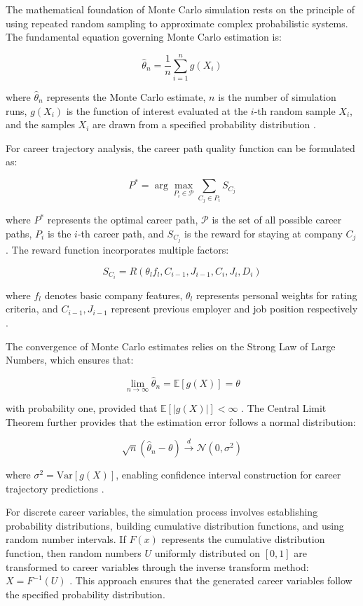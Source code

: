 \documentclass[main.tex]{subfiles}
\begin{document}
The mathematical foundation of Monte Carlo simulation rests on the principle of using repeated random sampling to approximate complex probabilistic systems. The fundamental equation governing Monte Carlo estimation is:

$$\hat{\theta}_n = \frac{1}{n}\sum_{i=1}^{n} g(X_i)$$

where $\hat{\theta}_n$ represents the Monte Carlo estimate, $n$ is the number of simulation runs, $g(X_i)$ is the function of interest evaluated at the $i$-th random sample $X_i$, and the samples $X_i$ are drawn from a specified probability distribution \parencite{usp2024,sciencedirect2024}.

For career trajectory analysis, the career path quality function can be formulated as:

$$P^* = \arg\max_{P_i \in \mathcal{P}} \sum_{C_j \in P_i} S_{C_j}$$

where $P^*$ represents the optimal career path, $\mathcal{P}$ is the set of all possible career paths, $P_i$ is the $i$-th career path, and $S_{C_j}$ is the reward for staying at company $C_j$ \parencite{guo2022nature}. The reward function incorporates multiple factors:

$$S_{C_i} = R(\theta_l f_l, C_{i-1}, J_{i-1}, C_i, J_i, D_i)$$

where $f_l$ denotes basic company features, $\theta_l$ represents personal weights for rating criteria, and $C_{i-1}, J_{i-1}$ represent previous employer and job position respectively \parencite{guo2022nature}.

The convergence of Monte Carlo estimates relies on the Strong Law of Large Numbers, which ensures that:

$$\lim_{n \to \infty} \hat{\theta}_n = \mathbb{E}[g(X)] = \theta$$

with probability one, provided that $\mathbb{E}[|g(X)|] < \infty$ \parencite{usp2024}. The Central Limit Theorem further provides that the estimation error follows a normal distribution:

$$\sqrt{n}(\hat{\theta}_n - \theta) \xrightarrow{d} \mathcal{N}(0, \sigma^2)$$

where $\sigma^2 = \text{Var}[g(X)]$, enabling confidence interval construction for career trajectory predictions \parencite{poldrack2022}.

For discrete career variables, the simulation process involves establishing probability distributions, building cumulative distribution functions, and using random number intervals. If $F(x)$ represents the cumulative distribution function, then random numbers $U$ uniformly distributed on $[0,1]$ are transformed to career variables through the inverse transform method: $X = F^{-1}(U)$ \parencite{zainordin2022}. This approach ensures that the generated career variables follow the specified probability distribution.
\end{document}
